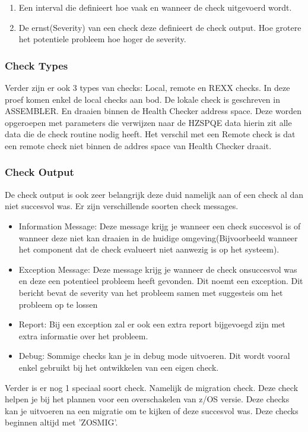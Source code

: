 \begin{enumerate}
	\item Een interval die definieert hoe vaak en wanneer de check uitgevoerd wordt.
	\item De ernst(Severity) van een check deze definieert de check output. Hoe grotere het potentiele probleem hoe hoger de severity. 
\end{enumerate}

\subsubsection{Check Types}
\label{subsubsec:Check Type}

Verder zijn er ook 3 types van checks: Local, remote en REXX checks. In deze proef komen enkel de local checks aan bod. De lokale check is geschreven in ASSEMBLER. En draaien binnen de Health Checker address space. Deze worden opgeroepen met parameters die verwijzen naar de HZSPQE data hierin zit alle data die de check routine nodig heeft. Het verschil met een Remote check is dat een remote check niet binnen de addres space van Health Checker draait. 

\subsubsection{Check Output}
\label{subsubsec:Check Output}

De check output is ook zeer belangrijk deze duid namelijk aan of een check al dan niet succesvol was. Er zijn verschillende soorten check messages.

\begin{itemize}
	\item Information Message: Deze message krijg je wanneer een check succesvol is of wanneer deze niet kan draaien in de huidige omgeving(Bijvoorbeeld wanneer het component dat de check evalueert niet aanwezig is op het systeem).
	\item Exception Message: Deze message krijg je wanneer de check onsuccesvol was en deze een potentieel probleem heeft gevonden. Dit noemt een exception. Dit bericht bevat de severity van het probleem samen met suggesteis om het probleem op te lossen
	\item Report: Bij een exception zal er ook een extra report bijgevoegd zijn met extra informatie over het probleem.
	\item Debug: Sommige checks kan je in debug mode uitvoeren. Dit wordt vooral enkel gebruikt bij het ontwikkelen van een eigen check.	
\end{itemize}

Verder is er nog 1 speciaal soort check. Namelijk de migration check. Deze check helpen je bij het plannen voor een overschakelen van z/OS versie. Deze checks kan je uitvoeren na een migratie om te kijken of deze succesvol was. Deze checks beginnen altijd met 'ZOSMIG'.
